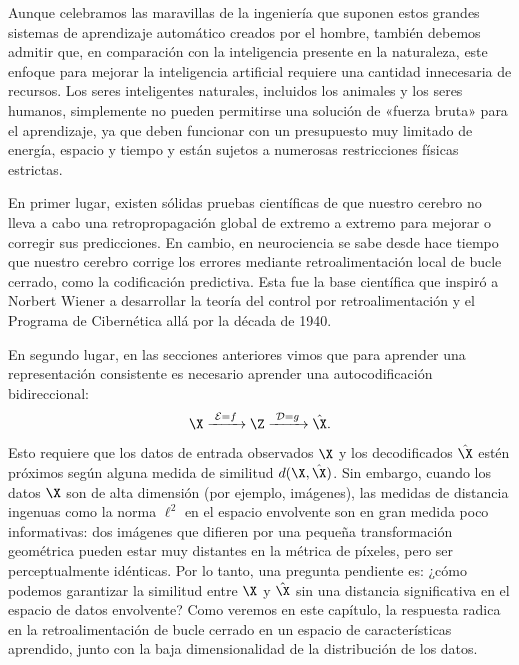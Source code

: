 \documentclass[../../book-main_es.tex]{subfiles}
\begin{document}
Aunque celebramos las maravillas de la ingeniería que suponen estos grandes sistemas de aprendizaje automático
creados por el hombre, también debemos admitir que, en comparación con
la inteligencia presente en la naturaleza, este enfoque para mejorar la inteligencia artificial
requiere una cantidad innecesaria de recursos. Los seres inteligentes
naturales, incluidos los animales y los seres humanos, simplemente no pueden permitirse una
solución de «fuerza bruta» para el aprendizaje, ya que deben funcionar con un
presupuesto muy limitado de energía, espacio y tiempo y están sujetos a numerosas
restricciones físicas estrictas.

En primer lugar, existen sólidas pruebas científicas de que nuestro cerebro no
lleva a cabo una retropropagación global de extremo a extremo para mejorar o corregir sus
predicciones. En cambio, en neurociencia se sabe desde hace tiempo que nuestro
cerebro corrige los errores mediante retroalimentación local de bucle cerrado, como
la codificación predictiva. Esta fue la base científica que inspiró
a Norbert Wiener a desarrollar la teoría del control por retroalimentación y el
Programa de Cibernética allá por la década de 1940.

En segundo lugar, en las secciones anteriores vimos que para aprender una
representación consistente es necesario aprender una autocodificación bidireccional:
\begin{equation}
    \X
    \xrightarrow{\hspace{1mm} \mathcal{E} = f \hspace{1mm}} \Z
    \xrightarrow{\hspace{1mm} \mathcal{D} = g \hspace{1mm}} \hat{\X}.
\end{equation}
Esto requiere que los datos de entrada observados $\X$ y los decodificados
$\hat \X$ estén próximos según alguna medida de similitud $d(\X, \hat \X)$.
Sin embargo, cuando los datos $\X$ son de alta dimensión (por ejemplo, imágenes), las medidas de distancia ingenuas
como la norma $\ell^2$ en el espacio envolvente son
en gran medida poco informativas: dos imágenes que difieren por una pequeña transformación geométrica
pueden estar muy distantes en la métrica de píxeles, pero ser perceptualmente
idénticas. Por lo tanto, una pregunta pendiente es: ¿cómo podemos garantizar
la similitud entre $\X$ y $\hat \X$ sin una distancia significativa
en el espacio de datos envolvente? Como veremos en este capítulo, la respuesta
radica en la retroalimentación de bucle cerrado en un espacio de características aprendido, junto con
la baja dimensionalidad de la distribución de los datos.
\end{document}

